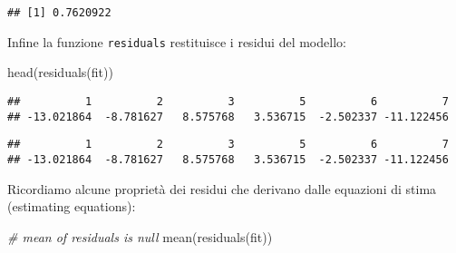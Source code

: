 \documentclass[
]{article}
\newenvironment{Shaded}{\begin{snugshade}}{\end{snugshade}}
\newcommand{\CommentTok}[1]{\textcolor[rgb]{0.56,0.35,0.01}{\textit{#1}}}
\newcommand{\DecValTok}[1]{\textcolor[rgb]{0.00,0.00,0.81}{#1}}
\newcommand{\FunctionTok}[1]{\textcolor[rgb]{0.00,0.00,0.00}{#1}}
\newcommand{\NormalTok}[1]{#1}
\newcommand{\SpecialCharTok}[1]{\textcolor[rgb]{0.00,0.00,0.00}{#1}}
\begin{document}
\begin{Shaded}
\end{Shaded}

\begin{verbatim}
## [1] 0.7620922
\end{verbatim}

Infine la funzione \texttt{residuals} restituisce i residui del modello:

\begin{Shaded}
\begin{Highlighting}[]
\FunctionTok{head}\NormalTok{(}\FunctionTok{residuals}\NormalTok{(fit))}
\end{Highlighting}
\end{Shaded}

\begin{verbatim}
##          1          2          3          5          6          7 
## -13.021864  -8.781627   8.575768   3.536715  -2.502337 -11.122456
\end{verbatim}

\begin{Shaded}
\end{Shaded}

\begin{verbatim}
##          1          2          3          5          6          7 
## -13.021864  -8.781627   8.575768   3.536715  -2.502337 -11.122456
\end{verbatim}

Ricordiamo alcune proprietà dei residui che derivano dalle equazioni di
stima (estimating equations):

\begin{Shaded}
\begin{Highlighting}[]
\CommentTok{\# mean of residuals is null }
\FunctionTok{mean}\NormalTok{(}\FunctionTok{residuals}\NormalTok{(fit))}
\end{Highlighting}
\end{Shaded}
\end{document}

